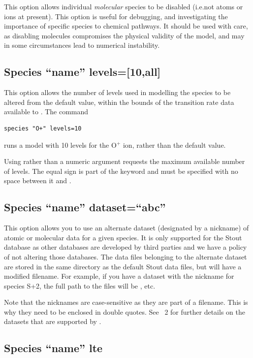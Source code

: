 This option allows individual {\em molecular}\/ species to be disabled
(i.e.\@ not atoms or ions at present).  This option is useful for
debugging, and investigating the importance of specific species to
chemical pathways.  It should be used with care, as disabling
molecules compromises the physical validity of the model, and may in
some circumstances lead to numerical instability.

\subsection{Species ``name'' levels=[10,all]}

This option allows the number of levels used in modelling
the species to be altered from the default value, within the bounds of
the transition rate data available to \Cloudy.  The command
\begin{verbatim}
species "O+" levels=10
\end{verbatim}
runs a model with 10  levels for the O$^+$ ion, rather than
the default value.  

Using  rather than a numeric
argument requests the maximum available number of levels.
The equal sign is part of the keyword and must be specified with no space
between it and  .

\subsection{Species ``name'' dataset=``abc''}

This option allows you to use an alternate dataset (designated by a nickname)
of atomic or molecular data for a given species. It is only supported for the
Stout database as other databases are developed by third parties and we have a
policy of not altering those databases. The data files belonging to the
alternate dataset are stored in the same directory as the default Stout data
files, but will have a modified filename. For example, if you have a dataset
with the nickname  for species S+2, the full path to the files
will be , etc.

Note that the nicknames are case-sensitive as they are part of a filename.
This is why they need to be enclosed in double quotes. See \Hazy~2 for further
details on the datasets that are supported by \Cloudy.

\subsection{Species ``name'' lte}

